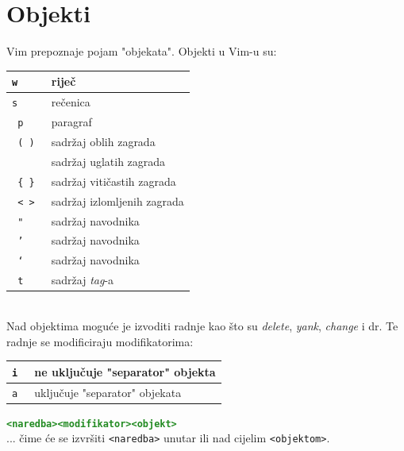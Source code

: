 \documentclass[10pt]{article}
\begin{document}
    \section*{\color{ForestGreen} Objekti}
    Vim prepoznaje pojam "objekata".
    Objekti u Vim-u su:
    \\
    \begin{tabular}{|>{\tt}p{9.00cm}|>{}p{15.50cm}|}
        \hline
        w         & riječ                           \\ \hline
        s         & rečenica                        \\ \hline
        p         & paragraf                        \\ \hline
        ( )       & sadržaj oblih zagrada           \\ \hline
        [ ]       & sadržaj uglatih zagrada         \\ \hline
        \{ \}     & sadržaj vitičastih zagrada      \\ \hline
        < >       & sadržaj izlomljenih zagrada     \\ \hline
        "         & sadržaj navodnika               \\ \hline
        '         & sadržaj navodnika               \\ \hline
        `         & sadržaj navodnika               \\ \hline
        t         & sadržaj \textit{tag}-a          \\ \hline
    \end{tabular}
    \\
    Nad objektima moguće je izvoditi radnje kao što su \textit{delete}, \textit{yank}, \textit{change} i dr. 
    Te radnje se modificiraju modifikatorima:
    \\
    \begin{tabular}{|>{\tt}p{9.00cm}|>{}p{15.50cm}|}
        \hline
        i         & ne uključuje "separator" objekta    \\ \hline
        a         & uključuje "separator" objekata      \\ \hline
    \end{tabular}
    \begin{center}
        \large
        \textcolor{ForestGreen}{\texttt{\textbf{<naredba><modifikator><objekt>}}}
        \\
        ... čime će se izvršiti \texttt{<naredba>} unutar ili nad cijelim \texttt{<objektom>}. 
    \end{center}
    \newpage
\end{document}
